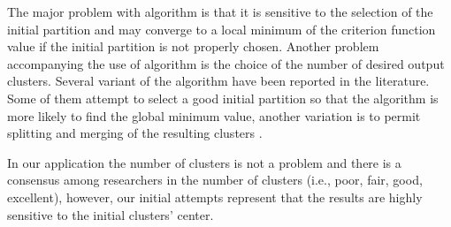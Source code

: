 The major problem with \kmeans{} algorithm is that it is sensitive to the selection of the initial partition and may converge to a local minimum of the criterion function value if the initial partition is not properly chosen. Another problem accompanying the use of \kmeans{} algorithm is the choice of the number of desired output clusters. Several variant of the \kmeans{} algorithm have been reported in the literature. Some of them attempt to select a good initial partition so that the algorithm is more likely to find the global minimum value, another variation is to permit splitting and merging of the resulting clusters \citep{Jain_1999}. 

In our application the number of clusters is not a problem and there is a consensus among researchers in the number of clusters (i.e., poor, fair, good, excellent), however, our initial attempts represent that the results are highly sensitive to the initial clusters' center. 

